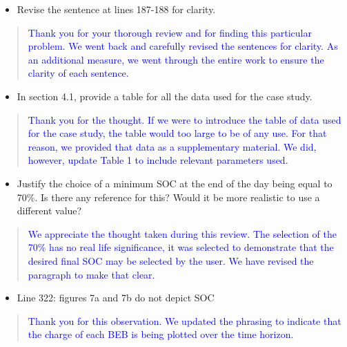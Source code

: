 \documentclass[11pt,a4paper,final]{article}
\begin{document}
\begin{itemize}
\item Revise the sentence at lines 187-188 for clarity.
\end{itemize}

\begin{quote}
  \textcolor{blue}{Thank you for your thorough review and for finding this particular problem. We went back and carefully revised the sentences for clarity. As an additional measure, we went through the entire work to ensure the clarity of each sentence.}
\end{quote}

\begin{itemize}
\item In section 4.1, provide a table for all the data used for the case study.
\end{itemize}

\begin{quote}
  \textcolor{blue}{Thank you for the thought. If we were to introduce the table of data used for the case study, the table would too large to be of any use. For that reason, we provided that data as a supplementary material. We did, however, update Table 1 to include relevant parameters used.}
\end{quote}

\begin{itemize}
\item Justify the choice of a minimum SOC at the end of the day being equal to 70\%. Is there any reference for this? Would it be more realistic to use a different value?
\end{itemize}

\begin{quote}
  \textcolor{blue}{We appreciate the thought taken during this review. The selection of the 70\% has no real life significance, it was selected to demonstrate that the desired final SOC may be selected by the user. We have revised the paragraph to make that clear.}
\end{quote}

\begin{itemize}
\item Line 322: figures 7a and 7b do not depict SOC
\end{itemize}

\begin{quote}
  \textcolor{blue}{Thank you for this observation. We updated the phrasing to indicate that the charge of each BEB is being plotted over the time horizon.}
\end{quote}
\end{document}
